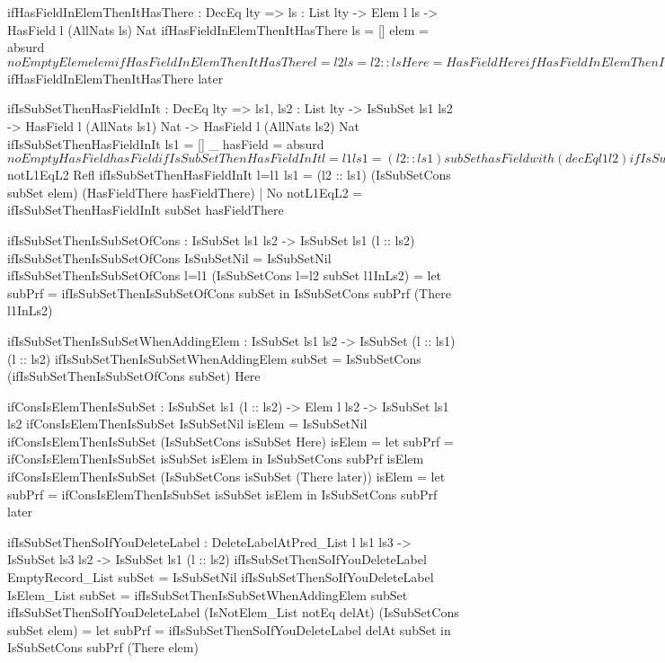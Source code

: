 \begin{code}
ifHasFieldInElemThenItHasThere : DecEq lty => {ls : List lty} -> 
  Elem l ls -> HasField l (AllNats ls) Nat
ifHasFieldInElemThenItHasThere {ls = []} elem = 
  absurd $ noEmptyElem elem
ifHasFieldInElemThenItHasThere {l = l2} {ls = l2 :: ls} Here = 
  HasFieldHere
ifHasFieldInElemThenItHasThere {l = l1} {ls = l2 :: ls} 
  (There later) = 
  HasFieldThere $ ifHasFieldInElemThenItHasThere later

ifIsSubSetThenHasFieldInIt : DecEq lty => 
  {ls1, ls2 : List lty} -> IsSubSet ls1 ls2 -> 
  HasField l (AllNats ls1) Nat -> HasField l (AllNats ls2) Nat
ifIsSubSetThenHasFieldInIt {ls1 = []} _ hasField = 
  absurd $ noEmptyHasField hasField
ifIsSubSetThenHasFieldInIt {l=l1} {ls1 = (l2 :: ls1)} subSet 
  hasField with (decEq l1 l2)
  ifIsSubSetThenHasFieldInIt {l=l1} {ls1 = (l1 :: ls1)} 
  (IsSubSetCons subSet elem) hasField | Yes Refl = 
    ifHasFieldInElemThenItHasThere elem
  ifIsSubSetThenHasFieldInIt {l=l1} {ls1 = (l1 :: ls1)} 
    (IsSubSetCons subSet elem) HasFieldHere | No notL1EqL2 = 
    absurd $ notL1EqL2 Refl
  ifIsSubSetThenHasFieldInIt {l=l1} {ls1 = (l2 :: ls1)} 
    (IsSubSetCons subSet elem) (HasFieldThere hasFieldThere) | 
    No notL1EqL2 = 
    ifIsSubSetThenHasFieldInIt subSet hasFieldThere

ifIsSubSetThenIsSubSetOfCons : IsSubSet ls1 ls2 -> 
  IsSubSet ls1 (l :: ls2)
ifIsSubSetThenIsSubSetOfCons IsSubSetNil = IsSubSetNil
ifIsSubSetThenIsSubSetOfCons {l=l1} 
  (IsSubSetCons {l=l2} subSet l1InLs2) = 
  let subPrf = ifIsSubSetThenIsSubSetOfCons subSet
  in IsSubSetCons subPrf (There l1InLs2)

ifIsSubSetThenIsSubSetWhenAddingElem : IsSubSet ls1 ls2 -> 
  IsSubSet (l :: ls1) (l :: ls2)
ifIsSubSetThenIsSubSetWhenAddingElem subSet = 
  IsSubSetCons (ifIsSubSetThenIsSubSetOfCons subSet) Here

ifConsIsElemThenIsSubSet : IsSubSet ls1 (l :: ls2) -> 
  Elem l ls2 -> IsSubSet ls1 ls2
ifConsIsElemThenIsSubSet IsSubSetNil isElem = IsSubSetNil
ifConsIsElemThenIsSubSet (IsSubSetCons isSubSet Here) isElem = 
  let subPrf = ifConsIsElemThenIsSubSet isSubSet isElem
  in IsSubSetCons subPrf isElem
ifConsIsElemThenIsSubSet (IsSubSetCons isSubSet (There later)) 
  isElem = 
  let subPrf = ifConsIsElemThenIsSubSet isSubSet isElem
  in IsSubSetCons subPrf later

ifIsSubSetThenSoIfYouDeleteLabel : 
  DeleteLabelAtPred_List l ls1 ls3 -> IsSubSet ls3 ls2 -> 
  IsSubSet ls1 (l :: ls2)
ifIsSubSetThenSoIfYouDeleteLabel EmptyRecord_List subSet = 
  IsSubSetNil
ifIsSubSetThenSoIfYouDeleteLabel IsElem_List subSet = 
  ifIsSubSetThenIsSubSetWhenAddingElem subSet
ifIsSubSetThenSoIfYouDeleteLabel (IsNotElem_List notEq delAt) 
  (IsSubSetCons subSet elem) = 
  let subPrf = ifIsSubSetThenSoIfYouDeleteLabel delAt subSet
  in IsSubSetCons subPrf (There elem)


\end{code}
